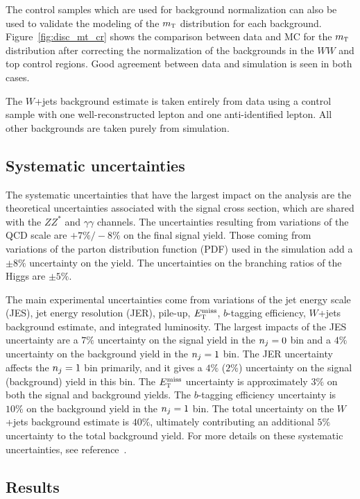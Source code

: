 The control samples which are used for background normalization can also be used to validate the modeling of the $m_{\textrm{\footnotesize\sc t}}$ distribution for each background. Figure~\ref{fig:disc_mt_cr} shows the comparison between data and MC for the $m_{\textrm{\footnotesize\sc t}}$ distribution after correcting the normalization of the backgrounds in the $WW$ and top control regions. Good agreement between data and simulation is seen in both cases. 

The $W$+jets background estimate is taken entirely from data using a control sample with one well-reconstructed lepton and one anti-identified lepton. All other backgrounds are taken purely from simulation. 

\subsection{Systematic uncertainties}

The systematic uncertainties that have the largest impact on the analysis are the theoretical uncertainties associated with the signal cross section, which are shared with the $ZZ^*$ and $\gamma\gamma$ channels. The uncertainties resulting from variations of the QCD scale are $+7\%/-8\%$ on the final signal yield. Those coming from variations of the parton distribution function (PDF) used in the simulation add a $\pm 8\%$ uncertainty on the yield. The uncertainties on the branching ratios of the Higgs are $\pm 5\%$. 

The main experimental uncertainties come from variations of the jet energy scale (JES), jet energy resolution (JER), pile-up, $E_{\textrm{\footnotesize\sc t}}^{\rm miss}$, $b$-tagging efficiency, $W$+jets background estimate, and integrated luminosity. The largest impacts of the JES uncertainty are a $7\%$ uncertainty on the signal yield in the $n_j = 0$ bin and a $4\%$ uncertainty on the background yield in the $n_j = 1$ bin. The JER uncertainty affects the $n_j = 1$ bin primarily, and it gives a $4\%$ ($2\%$) uncertainty on the signal (background) yield in this bin. The $E_{\textrm{\footnotesize\sc t}}^{\rm miss}$ uncertainty is approximately $3\%$ on both the signal and background yields. The $b$-tagging efficiency uncertainty is $10\%$ on the background yield in the $n_j = 1$ bin. The total uncertainty on the $W$+jets background estimate is $40\%$, ultimately contributing an additional $5\%$ uncertainty to the total background yield.  For more details on these systematic uncertainties, see reference~\cite{Discovery}.  

\subsection{Results}

